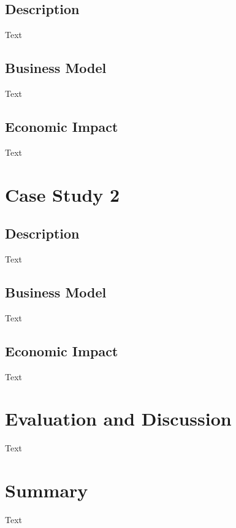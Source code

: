 	\subsection{Description}
	Text
	\subsection{Business Model}
	Text
	\subsection{Economic Impact}
	Text

\section{Case Study 2}
	\subsection{Description}
	Text
	\subsection{Business Model}
	Text
	\subsection{Economic Impact}
	Text

\section{Evaluation and Discussion}
Text

\section{Summary}
Text
